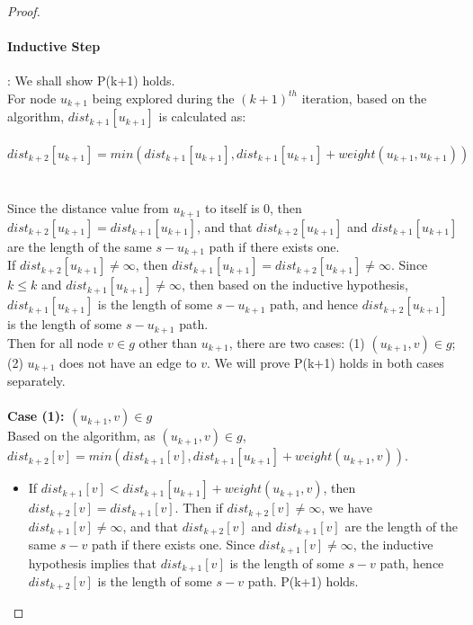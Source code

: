 \begin{proof}
\paragraph*{Inductive Step}: We shall show P(k+1) holds.
\\
For node $u_{k+1}$ being explored during the $(k+1)^{th}$ iteration, based on the algorithm, $dist_{k+1}[u_{k+1}]$ is calculated as: 
\\\\
\tab\[
        dist_{k+2}[u_{k+1}] = min(dist_{k+1}[u_{k+1}], dist_{k+1}[u_{k+1}] + weight(u_{k+1},u_{k+1}))
      \]
\\\\
Since the distance value from $u_{k+1}$ to itself is $0$, then $dist_{k+2}[u_{k+1}] = dist_{k+1}[u_{k+1}]$, and that $dist_{k+2}[u_{k+1}]$ and $dist_{k+1}[u_{k+1}]$ are the length of the same $s-u_{k+1}$ path if there exists one. 
\\
If $dist_{k+2}[u_{k+1}] \neq \infty$, then $dist_{k+1}[u_{k+1}] = dist_{k+2}[u_{k+1}] \neq \infty$. Since $k \leq k$ and $dist_{k+1}[u_{k+1}] \neq \infty$, then based on the inductive hypothesis, $dist_{k+1}[u_{k+1}]$ is the length of some $s-u_{k+1}$ path, and hence $dist_{k+2}[u_{k+1}]$ is the length of some $s-u_{k+1}$ path.
\\
Then for all node $v \in g$ other than $u_{k+1}$, there are two cases: (1) $(u_{k+1}, v) \in g$; (2) $u_{k+1}$ does not have an edge to $v$. We will prove P(k+1) holds in both cases separately. 
\\\\
\textbf{Case (1): $(u_{k+1}, v) \in g$}
\tab\\
Based on the algorithm, as $(u_{k+1}, v) \in g$, $dist_{k+2}[v] = min(dist_{k+1}[v], dist_{k+1}[u_{k+1}] + weight(u_{k+1}, v))$. 
\begin{itemize}
  \item If $dist_{k+1}[v] < dist_{k+1}[u_{k+1}] + weight(u_{k+1}, v)$, then $dist_{k+2}[v] = dist_{k+1}[v]$. Then if $dist_{k+2}[v] \neq \infty$, we have $dist_{k+1}[v] \neq \infty$, and that $dist_{k+2}[v]$ and $dist_{k+1}[v]$ are the length of the same $s-v$ path if there exists one. Since $dist_{k+1}[v] \neq \infty$, the inductive hypothesis implies that $dist_{k+1}[v]$ is the length of some $s-v$ path, hence $dist_{k+2}[v]$ is the length of some $s-v$ path. P(k+1) holds. 


\end{itemize}
\end{proof}
